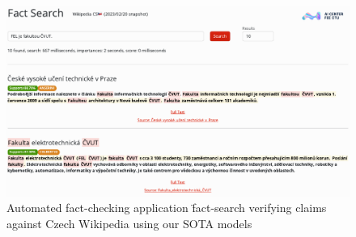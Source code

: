 \begin{figure}
    \includegraphics[width=16cm]{fig/factsearch.pdf}
    \caption{Automated fact-checking application \"{fact-search} verifying claims against Czech Wikipedia using our SOTA models}
    \label{fig:factsearch}
\end{figure}
%
